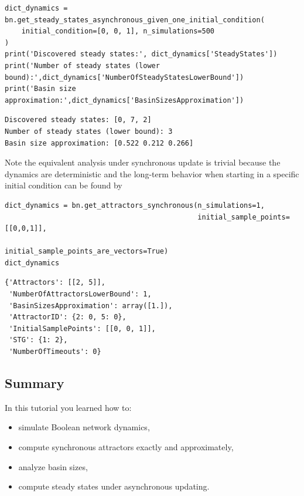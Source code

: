 \documentclass[
]{article}
\providecommand{\tightlist}{%
  \setlength{\itemsep}{0pt}\setlength{\parskip}{0pt}}
\begin{document}
\begin{lstlisting}
dict_dynamics = bn.get_steady_states_asynchronous_given_one_initial_condition(
    initial_condition=[0, 0, 1], n_simulations=500
)
print('Discovered steady states:', dict_dynamics['SteadyStates'])
print('Number of steady states (lower bound):',dict_dynamics['NumberOfSteadyStatesLowerBound'])
print('Basin size approximation:',dict_dynamics['BasinSizesApproximation'])
\end{lstlisting}

\begin{lstlisting}
Discovered steady states: [0, 7, 2]
Number of steady states (lower bound): 3
Basin size approximation: [0.522 0.212 0.266]
\end{lstlisting}

Note the equivalent analysis under synchronous update is trivial because
the dynamics are deterministic and the long-term behavior when starting
in a specific initial condition can be found by

\begin{lstlisting}
dict_dynamics = bn.get_attractors_synchronous(n_simulations=1,
                                              initial_sample_points=[[0,0,1]],
                                              initial_sample_points_are_vectors=True)
dict_dynamics
\end{lstlisting}

\begin{lstlisting}
{'Attractors': [[2, 5]],
 'NumberOfAttractorsLowerBound': 1,
 'BasinSizesApproximation': array([1.]),
 'AttractorID': {2: 0, 5: 0},
 'InitialSamplePoints': [[0, 0, 1]],
 'STG': {1: 2},
 'NumberOfTimeouts': 0}
\end{lstlisting}

\subsection{Summary}\label{summary-5}

In this tutorial you learned how to:

\begin{itemize}
\tightlist
\item
  simulate Boolean network dynamics,
\item
  compute synchronous attractors exactly and approximately,
\item
  analyze basin sizes,
\item
  compute steady states under asynchronous updating.
\end{itemize}
\end{document}
